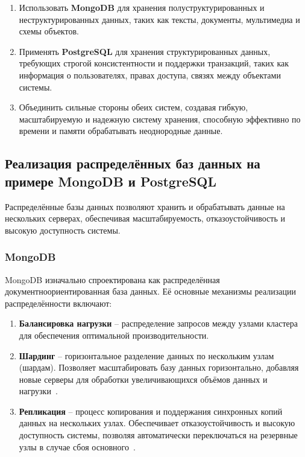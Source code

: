 \begin{enumerate}[wide=12.5mm, leftmargin=12.5mm]
    \item Использовать \textbf{MongoDB} для хранения полуструктурированных и неструктурированных данных, таких как тексты, документы, мультимедиа и схемы объектов.
    \item Применять \textbf{PostgreSQL} для хранения структурированных данных, требующих строгой консистентности и поддержки транзакций, таких как информация о пользователях, правах доступа, связях между объектами системы.
    \item Объединить сильные стороны обеих систем, создавая гибкую, масштабируемую и надежную систему хранения, способную эффективно по времени и памяти обрабатывать неоднородные данные.
\end{enumerate}

\subsection{Реализация распределённых баз данных на примере MongoDB и PostgreSQL}

Распределённые базы данных позволяют хранить и обрабатывать данные на нескольких серверах, обеспечивая масштабируемость, отказоустойчивость и высокую доступность системы.

\subsubsection{MongoDB}

MongoDB изначально спроектирована как распределённая документноориентированная база данных. 
Её основные механизмы реализации распределённости включают:

\begin{enumerate}[wide=12.5mm, leftmargin=12.5mm]
    \item \textbf{Балансировка нагрузки} -- распределение запросов между узлами кластера для обеспечения оптимальной производительности.
    \item \textbf{Шардинг} -- горизонтальное разделение данных по нескольким узлам (шардам). Позволяет масштабировать базу данных горизонтально, добавляя новые серверы для обработки увеличивающихся объёмов данных и нагрузки~\cite{shard-rep}.
    \item \textbf{Репликация} -- процесс копирования и поддержания синхронных копий данных на нескольких узлах. Обеспечивает отказоустойчивость и высокую доступность системы, позволяя автоматически переключаться на резервные узлы в случае сбоя основного~\cite{shard-rep}.
\end{enumerate}


